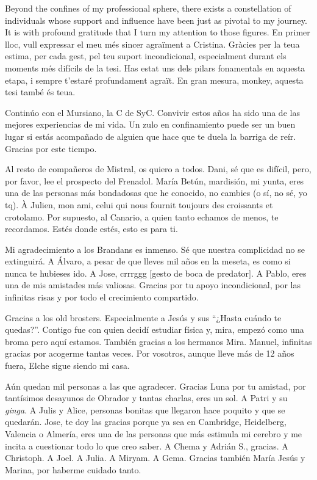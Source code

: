  
Beyond the confines of my professional sphere, there exists a constellation of individuals whose support and influence have been just as pivotal to my journey. It is with profound gratitude that I turn my attention to those
figures.
En primer lloc, vull expressar el meu més sincer agraïment a Cristina. Gràcies per la teua estima, per cada gest, pel teu suport incondicional, especialment durant els moments més difícils de la tesi. Has estat uns dels pilars fonamentals en aquesta etapa, i sempre t'estaré profundament agraït. En gran mesura, monkey, aquesta tesi també és teua.

Continúo con el Mursiano, la C de SyC. Convivir estos años ha sido una de las mejores experiencias de mi vida. 
Un zulo en confinamiento puede ser un buen lugar si estás acompañado de 
alguien que hace que te duela la barriga de reír. Gracias por este tiempo.

Al resto de compañeros de Mistral, os quiero a todos. 
Dani, sé que es difícil, pero, por favor, lee el prospecto del Frenadol.
María Betún, mardisión, mi yunta, eres una de las personas más bondadosas que he conocido, no cambies (o sí, no sé, yo tq).
À Julien, mon ami, celui qui nous fournit toujours des croissants et crotolamo.
Por supuesto, al Canario, a quien tanto echamos de menos, te recordamos. Estés
donde estés, esto es para ti.

Mi agradecimiento a los Brandans es inmenso. Sé que nuestra complicidad no se extinguirá.
A Álvaro, a pesar de que lleves mil años en la meseta, es como si nunca te hubieses ido.
A Jose, crrrggg $[$gesto de boca de predator$]$. 
A Pablo, eres una de mis amistades más valiosas. Gracias por tu apoyo incondicional, 
por las infinitas risas y por todo el crecimiento compartido.

Gracias a los old brosters. Especialmente a Jesús y sus ``¿Hasta cuándo te quedas?''.
Contigo fue con quien decidí estudiar física y, mira, empezó como una broma pero aquí estamos. 
También gracias a los hermanos Mira. Manuel, infinitas gracias por acogerme tantas veces. 
Por vosotros, aunque lleve más de 12 años fuera, Elche sigue siendo mi casa.

Aún quedan mil personas a las que agradecer. 
Gracias Luna por tu amistad, por tantísimos desayunos de Obrador y tantas charlas, eres un sol. 
A Patri y su \textit{ginga}.
A Julis y Alice, personas bonitas que llegaron hace poquito y que se quedarán. 
Jose, te doy las gracias porque ya sea en Cambridge, Heidelberg, Valencia o Almería, eres una de las personas que más estimula mi cerebro y me incita a cuestionar todo lo que creo saber. 
A Chema y Adrián S., gracias. A Christoph. A Joel. A Julia.  A Miryam. A Gema. %
Gracias también María Jesús y Marina, por haberme cuidado tanto. 
%


